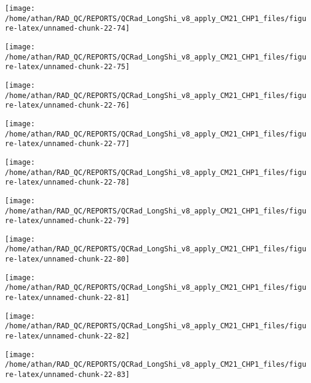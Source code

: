 \documentclass[
  10pt,
  a4paper,oneside]{article}
\begin{document}
\begin{center}\texttt{[image: /home/athan/RAD\_QC/REPORTS/QCRad\_LongShi\_v8\_apply\_CM21\_CHP1\_files/figure-latex/unnamed-chunk-22-74]} \end{center}

\begin{center}\texttt{[image: /home/athan/RAD\_QC/REPORTS/QCRad\_LongShi\_v8\_apply\_CM21\_CHP1\_files/figure-latex/unnamed-chunk-22-75]} \end{center}

\begin{center}\texttt{[image: /home/athan/RAD\_QC/REPORTS/QCRad\_LongShi\_v8\_apply\_CM21\_CHP1\_files/figure-latex/unnamed-chunk-22-76]} \end{center}

\begin{center}\texttt{[image: /home/athan/RAD\_QC/REPORTS/QCRad\_LongShi\_v8\_apply\_CM21\_CHP1\_files/figure-latex/unnamed-chunk-22-77]} \end{center}

\begin{center}\texttt{[image: /home/athan/RAD\_QC/REPORTS/QCRad\_LongShi\_v8\_apply\_CM21\_CHP1\_files/figure-latex/unnamed-chunk-22-78]} \end{center}

\begin{center}\texttt{[image: /home/athan/RAD\_QC/REPORTS/QCRad\_LongShi\_v8\_apply\_CM21\_CHP1\_files/figure-latex/unnamed-chunk-22-79]} \end{center}

\begin{center}\texttt{[image: /home/athan/RAD\_QC/REPORTS/QCRad\_LongShi\_v8\_apply\_CM21\_CHP1\_files/figure-latex/unnamed-chunk-22-80]} \end{center}

\begin{center}\texttt{[image: /home/athan/RAD\_QC/REPORTS/QCRad\_LongShi\_v8\_apply\_CM21\_CHP1\_files/figure-latex/unnamed-chunk-22-81]} \end{center}

\begin{center}\texttt{[image: /home/athan/RAD\_QC/REPORTS/QCRad\_LongShi\_v8\_apply\_CM21\_CHP1\_files/figure-latex/unnamed-chunk-22-82]} \end{center}

\begin{center}\texttt{[image: /home/athan/RAD\_QC/REPORTS/QCRad\_LongShi\_v8\_apply\_CM21\_CHP1\_files/figure-latex/unnamed-chunk-22-83]} \end{center}
\end{document}

